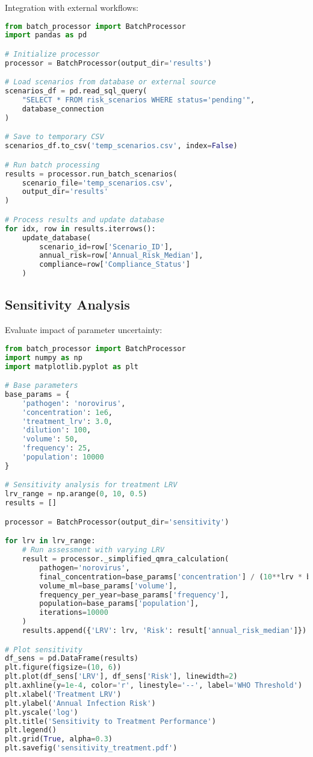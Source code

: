 \documentclass[11pt,a4paper]{article}
\begin{document}
Integration with external workflows:

\begin{lstlisting}[style=pythonstyle, language=Python]
from batch_processor import BatchProcessor
import pandas as pd

# Initialize processor
processor = BatchProcessor(output_dir='results')

# Load scenarios from database or external source
scenarios_df = pd.read_sql_query(
    "SELECT * FROM risk_scenarios WHERE status='pending'",
    database_connection
)

# Save to temporary CSV
scenarios_df.to_csv('temp_scenarios.csv', index=False)

# Run batch processing
results = processor.run_batch_scenarios(
    scenario_file='temp_scenarios.csv',
    output_dir='results'
)

# Process results and update database
for idx, row in results.iterrows():
    update_database(
        scenario_id=row['Scenario_ID'],
        annual_risk=row['Annual_Risk_Median'],
        compliance=row['Compliance_Status']
    )
\end{lstlisting}

\subsection{Sensitivity Analysis}

Evaluate impact of parameter uncertainty:

\begin{lstlisting}[style=pythonstyle, language=Python]
from batch_processor import BatchProcessor
import numpy as np
import matplotlib.pyplot as plt

# Base parameters
base_params = {
    'pathogen': 'norovirus',
    'concentration': 1e6,
    'treatment_lrv': 3.0,
    'dilution': 100,
    'volume': 50,
    'frequency': 25,
    'population': 10000
}

# Sensitivity analysis for treatment LRV
lrv_range = np.arange(0, 10, 0.5)
results = []

processor = BatchProcessor(output_dir='sensitivity')

for lrv in lrv_range:
    # Run assessment with varying LRV
    result = processor._simplified_qmra_calculation(
        pathogen='norovirus',
        final_concentration=base_params['concentration'] / (10**lrv * base_params['dilution']),
        volume_ml=base_params['volume'],
        frequency_per_year=base_params['frequency'],
        population=base_params['population'],
        iterations=10000
    )
    results.append({'LRV': lrv, 'Risk': result['annual_risk_median']})

# Plot sensitivity
df_sens = pd.DataFrame(results)
plt.figure(figsize=(10, 6))
plt.plot(df_sens['LRV'], df_sens['Risk'], linewidth=2)
plt.axhline(y=1e-4, color='r', linestyle='--', label='WHO Threshold')
plt.xlabel('Treatment LRV')
plt.ylabel('Annual Infection Risk')
plt.yscale('log')
plt.title('Sensitivity to Treatment Performance')
plt.legend()
plt.grid(True, alpha=0.3)
plt.savefig('sensitivity_treatment.pdf')
\end{lstlisting}
\end{document}
